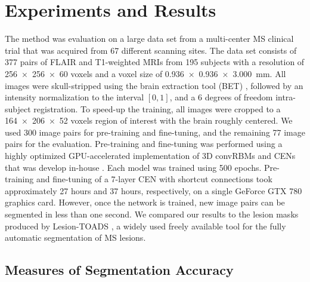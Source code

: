 
\section{Experiments and Results}



The method was evaluation on a large data set from a multi-center MS clinical
trial that was acquired from 67 different scanning sites. The data set consists
of 377 pairs of FLAIR and T1-weighted MRIs from 195 subjects with a resolution
of \num{256x256x60} voxels and a voxel size of
\SI{0.936x0.936x3.000}{\milli\metre}. All images were skull-stripped using the
brain extraction tool (BET) \cite{jenkinson2005bet2}, followed by an intensity
normalization to the interval $[0,1]$, and a 6 degrees of freedom intra-subject
registration. To speed-up the training, all images were cropped to a
\num{164x206x52} voxels region of interest with the brain roughly centered. We
used 300 image pairs for pre-training and fine-tuning, and the remaining 77
image pairs for the evaluation. Pre-training and fine-tuning was performed using
a highly optimized GPU-accelerated implementation of 3D convRBMs and CENs that
was develop in-house \cite{brosch2014efficient}. Each model was trained using
500 epochs.
Pre-training and fine-tuning of a 7-layer CEN with shortcut connections took
approximately 27 hours and 37 hours, respectively, on a single GeForce GTX 780
graphics card. However, once the network is trained, new image pairs can be
segmented in less than one second. We compared our results to the lesion masks
produced by Lesion-TOADS \cite{shiee2010topology}, a widely used freely
available tool for the fully automatic segmentation of MS lesions.

\subsection{Measures of Segmentation Accuracy}

